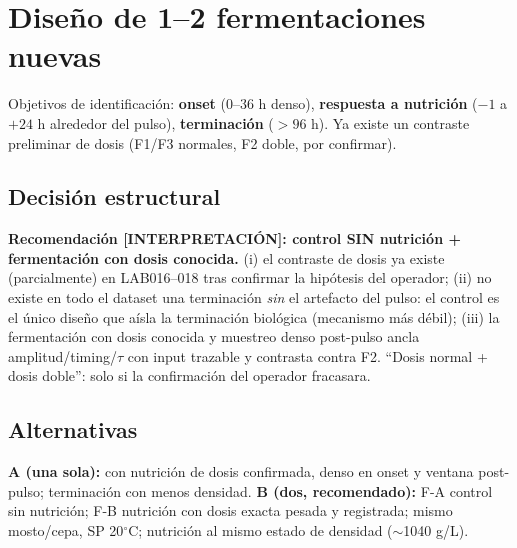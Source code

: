 \documentclass[11pt,a4paper]{article}
\newcommand{\interp}{\textcolor{interp}{\textbf{[INTERPRETACI\'ON]}}}
\begin{document}
\section{Dise\~no de 1--2 fermentaciones nuevas}

Objetivos de identificaci\'on: \textbf{onset} (0--36 h denso), \textbf{respuesta a nutrici\'on} ($-1$ a $+24$ h alrededor del pulso), \textbf{terminaci\'on} ($>96$ h). Ya existe un contraste preliminar de dosis (F1/F3 normales, F2 doble, por confirmar).

\subsection{Decisi\'on estructural}
\textbf{Recomendaci\'on \interp{}: control SIN nutrici\'on + fermentaci\'on con dosis conocida.} (i) el contraste de dosis ya existe (parcialmente) en LAB016--018 tras confirmar la hip\'otesis del operador; (ii) no existe en todo el dataset una terminaci\'on \emph{sin} el artefacto del pulso: el control es el \'unico dise\~no que a\'isla la terminaci\'on biol\'ogica (mecanismo m\'as d\'ebil); (iii) la fermentaci\'on con dosis conocida y muestreo denso post-pulso ancla amplitud/timing/$\tau$ con input trazable y contrasta contra F2. ``Dosis normal + dosis doble'': solo si la confirmaci\'on del operador fracasara.

\subsection{Alternativas}
\textbf{A (una sola):} con nutrici\'on de dosis confirmada, denso en onset y ventana post-pulso; terminaci\'on con menos densidad. \textbf{B (dos, recomendado):} F-A control sin nutrici\'on; F-B nutrici\'on con dosis exacta pesada y registrada; mismo mosto/cepa, SP 20$^\circ$C; nutrici\'on al mismo estado de densidad (${\sim}$1040 g/L).
\end{document}
